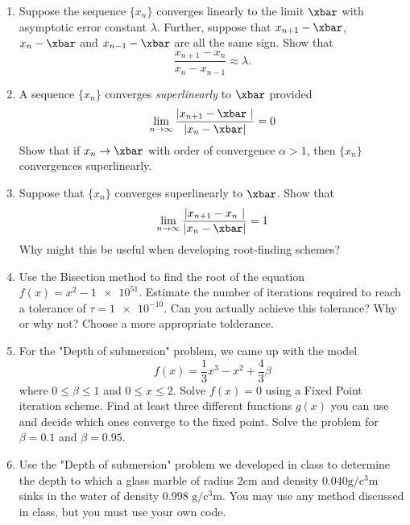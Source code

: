\documentclass{article}
\begin{document}
\begin{enumerate}

\item Suppose the sequence $\{x_n\}$ converges linearly to the limit $\xbar$ with asymptotic error constant $\lambda$.  Further, suppose that $x_{n+1}-\xbar$, $x_n - \xbar$ and $x_{n-1} - \xbar$ are all the same sign.  Show that 
\begin{equation}
\frac{x_{n+1} - x_n}{x_{n} - x_{n-1}} \approx \lambda.
\end{equation}

\item A sequence $\{x_n\}$ converges {\em superlinearly} to $\xbar$ provided
\begin{equation}
\lim_{n \rightarrow \infty} \frac{\left|x_{n+1} - \xbar\ \right|}{\left| x_n - \xbar\right|} = 0
\end{equation}
Show that if $x_n \rightarrow \xbar$ with order of convergence $\alpha > 1$, then $\{x_n\}$ convergences superlinearly.

\item Suppose that $\{x_n\}$ converges superlinearly to $\xbar$.  Show that
\begin{equation}
\lim_{n \rightarrow \infty} \frac{\left|x_{n+1} - x_n\ \right|}{\left| x_n - \xbar\right|} = 1
\end{equation}
Why might this be useful when developing root-finding schemes? 


\item Use the Bisection method to find the root of the equation $f(x) = x^2 - \num{1e51}$.  Estimate the number of iterations required to reach a tolerance of $\tau = \num{1e-10}$.  Can you actually achieve this tolerance?  Why or why not?  Choose a more appropriate tolderance. 

\item For the "Depth of submersion" problem, we came up with the model
\begin{equation}
f(x) = \frac{1}{3}x^3 - x^2 + \frac{4}{3}\beta
\end{equation}
where $0 \le \beta \le 1$ and $0 \le x \le 2$. Solve $f(x) = 0$ using a Fixed Point iteration scheme.  Find at least three different functions $g(x)$ you can use and decide which ones converge to the fixed point.  Solve the problem for $\beta = 0.1$ and $\beta = 0.95$.  

\item Use the "Depth of submersion" problem we developed in class to determine the depth to which a glass marble of radius $2 \si{\centi\metre}$ and density $0.040 \si{\gram\per\cubic\centi\metre}$ sinks in the water of density 0.998 $\si{\gram\per\cubic\centi\metre}$.  You may use any method discussed in class, but you must use your own code.  


\end{enumerate}
\end{document}
